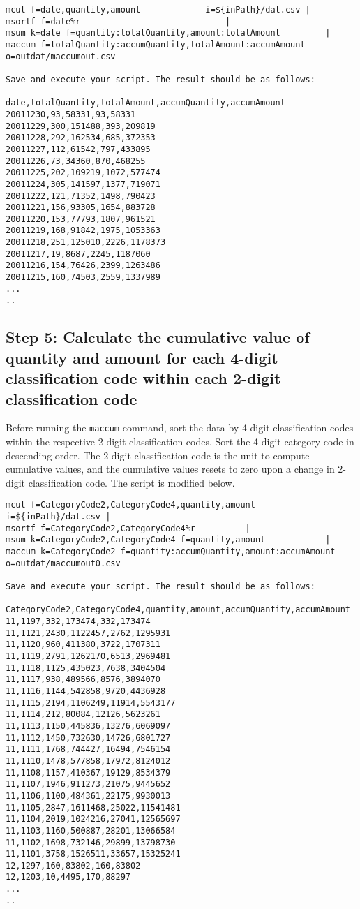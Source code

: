 \begin{verbatim}
mcut f=date,quantity,amount             i=${inPath}/dat.csv |
msortf f=date%r                         	|
msum k=date f=quantity:totalQuantity,amount:totalAmount         |
maccum f=totalQuantity:accumQuantity,totalAmount:accumAmount o=outdat/maccumout.csv

Save and execute your script. The result should be as follows:

date,totalQuantity,totalAmount,accumQuantity,accumAmount
20011230,93,58331,93,58331
20011229,300,151488,393,209819
20011228,292,162534,685,372353
20011227,112,61542,797,433895
20011226,73,34360,870,468255
20011225,202,109219,1072,577474
20011224,305,141597,1377,719071
20011222,121,71352,1498,790423
20011221,156,93305,1654,883728
20011220,153,77793,1807,961521
20011219,168,91842,1975,1053363
20011218,251,125010,2226,1178373
20011217,19,8687,2245,1187060
20011216,154,76426,2399,1263486
20011215,160,74503,2559,1337989
...
..
\end{verbatim}

\subsection{Step 5: Calculate the cumulative value of quantity and amount for each 4-digit classification code within each 2-digit classification code }

Before running the \verb|maccum| command, sort the data by 4 digit classification codes within the respective 2 digit classification codes. Sort the 4 digit category code in descending order. The 2-digit classification code is the unit to compute cumulative values, and the cumulative values resets to zero upon a change in 2-digit classification code. The script is modified below.

\begin{verbatim}
mcut f=CategoryCode2,CategoryCode4,quantity,amount      i=${inPath}/dat.csv |
msortf f=CategoryCode2,CategoryCode4%r          |
msum k=CategoryCode2,CategoryCode4 f=quantity,amount            |
maccum k=CategoryCode2 f=quantity:accumQuantity,amount:accumAmount o=outdat/maccumout0.csv

Save and execute your script. The result should be as follows:

CategoryCode2,CategoryCode4,quantity,amount,accumQuantity,accumAmount
11,1197,332,173474,332,173474
11,1121,2430,1122457,2762,1295931
11,1120,960,411380,3722,1707311
11,1119,2791,1262170,6513,2969481
11,1118,1125,435023,7638,3404504
11,1117,938,489566,8576,3894070
11,1116,1144,542858,9720,4436928
11,1115,2194,1106249,11914,5543177
11,1114,212,80084,12126,5623261
11,1113,1150,445836,13276,6069097
11,1112,1450,732630,14726,6801727
11,1111,1768,744427,16494,7546154
11,1110,1478,577858,17972,8124012
11,1108,1157,410367,19129,8534379
11,1107,1946,911273,21075,9445652
11,1106,1100,484361,22175,9930013
11,1105,2847,1611468,25022,11541481
11,1104,2019,1024216,27041,12565697
11,1103,1160,500887,28201,13066584
11,1102,1698,732146,29899,13798730
11,1101,3758,1526511,33657,15325241
12,1297,160,83802,160,83802
12,1203,10,4495,170,88297
...
..
\end{verbatim}

